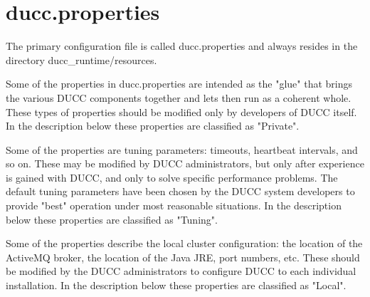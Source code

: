 \section{ducc.properties}
\label{sec:ducc.properties}
    The primary configuration file is called ducc.properties and always resides in the directory
    ducc\_runtime/resources.

    Some of the properties in ducc.properties are intended as the "glue" that brings the various 
    DUCC components together and lets then run as a coherent whole. These types of properties should 
    be modified only by developers of DUCC itself. In the description below these properties are 
    classified as "Private". 

    Some of the properties are tuning parameters: timeouts, heartbeat intervals, and so on. These
    may be modified by DUCC administrators, but only after experience is gained with DUCC, and only
    to solve specific performance problems. The default tuning parameters have been chosen by the
    DUCC system developers to provide "best" operation under most reasonable situations. In the
    description below these properties are classified as "Tuning".

    Some of the properties describe the local cluster configuration: the location of the ActiveMQ
    broker, the location of the Java JRE, port numbers, etc. These should be modified by the DUCC
    administrators to configure DUCC to each individual installation. In the description below these
    properties are classified as "Local".
    
